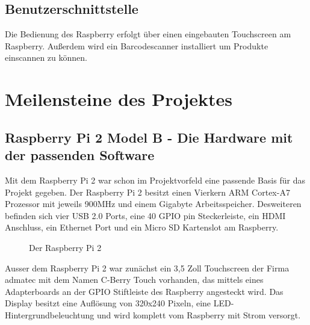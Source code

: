 \documentclass[11pt,a4paper]{article} %
\begin{document}
\subsection{Benutzerschnittstelle}
Die Bedienung des Raspberry erfolgt über einen eingebauten Touchscreen am Raspberry. Außerdem wird ein Barcodescanner installiert um Produkte einscannen zu können.

\newpage


\section{Meilensteine des Projektes}
\label{Meilensteine}

\subsection{Raspberry Pi 2 Model B - Die Hardware mit der passenden Software}
Mit dem Raspberry Pi 2 war schon im Projektvorfeld eine passende Basis für das Projekt gegeben. Der Raspberry Pi 2 besitzt einen Vierkern ARM Cortex-A7 Prozessor mit jeweils 900MHz und einem Gigabyte Arbeitsspeicher. Desweiteren befinden sich vier USB 2.0 Ports, eine 40 GPIO pin Steckerleiste, ein HDMI Anschluss, ein Ethernet Port und ein Micro SD Kartenslot am Raspberry.
	\begin{figure}[h]
	\caption{Der Raspberry Pi 2}
	\end{figure}
\par
Ausser dem Raspberry Pi 2 war zunächst ein 3,5 Zoll Touchscreen der Firma admatec \cite{1} mit dem Namen C-Berry Touch vorhanden, das mittels eines Adapterboards an der GPIO Stiftleiste des Raspberry angesteckt wird. Das Display besitzt eine Auflösung von 320x240 Pixeln, eine LED- Hintergrundbeleuchtung und wird komplett vom Raspberry mit Strom versorgt.
\par
\end{document}
